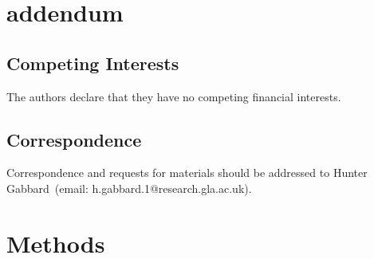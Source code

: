\documentclass[%
showpacs,
nofootinbib,
 amsmath,amssymb,
 aps,
 twocolumn,
 prl,
 reprint,
floatfix,
]{revtex4-1}
\begin{document}

\section{addendum}
 \subsection{Competing Interests} 
    The authors declare that they have no competing financial interests.
 \subsection{Correspondence} Correspondence and requests for materials should be addressed to Hunter Gabbard~(email: h.gabbard.1@research.gla.ac.uk).

%
%
\section{Methods}\label{sec:methods}
%
\end{document}
